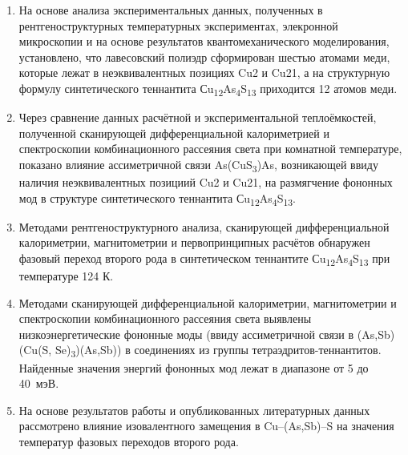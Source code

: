 \begin{enumerate}
						\item На основе анализа экспериментальных данных, полученных в рентгеноструктурных температурных экспериментах, элекронной микроскопии и на основе результатов квантомеханического моделирования, установлено, что
						лавесовский полиэдр сформирован шестью атомами меди, которые лежат в неэквивалентных позициях Cu2 и Cu21, а на структурную формулу синтетического теннантита Сu\textsubscript{12}As\textsubscript{4}S\textsubscript{13} приходится 12 атомов меди.
						\item Через сравнение данных расчётной  и  экспериментальной теплоёмкостей, полученной сканирующей дифференциальной калориметрией и спектроскопии комбинационного рассеяния света при комнатной температуре, показано влияние ассиметричной связи As(CuS\textsubscript{3})As, возникающей ввиду наличия неэквивалентных позициий Cu2 и Cu21, на размягчение фононных мод в структуре синтетического теннантита Сu\textsubscript{12}As\textsubscript{4}S\textsubscript{13}.
						\item Методами рентгеноструктурного анализа, сканирующей дифференциальной калориметрии, магнитометрии и первопринципных расчётов обнаружен фазовый переход второго рода в синтетическом теннантите Сu\textsubscript{12}As\textsubscript{4}S\textsubscript{13} при температуре 124 К.
						\item Методами сканирующей дифференциальной калориметрии, магнитометрии и спектроскопии комбинационного рассеяния света выявлены  низкоэнергетические фононные моды (ввиду  ассиметричной связи в (As,Sb)(Cu(S, Se)\textsubscript{3})(As,Sb)) в  соединениях из группы тетраэдритов-теннантитов. Найденные значения энергий фононных мод лежат в диапазоне от 5 до 40~мэВ.
						\item На основе результатов работы и опубликованных литературных данных рассмотрено влияние изовалентного замещения в Cu--(As,Sb)--S на значения температур фазовых переходов второго рода.

\end{enumerate}
